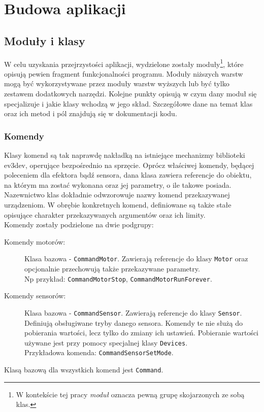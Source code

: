 \chapter{Budowa aplikacji}
\label{ch:budowa_aplikacji}

\section{Moduły i klasy}
\indent \indent W celu uzyskania przejrzystości aplikacji, wydzielone zostały moduły\footnote{W kontekście tej pracy \textit{moduł} oznacza pewną grupę skojarzonych ze sobą klas.}, które opisują pewien fragment funkcjonalności programu. Moduły niższych warstw mogą być wykorzystywane przez moduły warstw wyższych lub być tylko zestawem dodatkowych narzędzi. Kolejne punkty opisują w czym dany moduł się specjalizuje i jakie klasy wchodzą w jego skład. Szczegółowe dane na temat klas oraz ich metod i pól znajdują się w dokumentacji kodu.

\subsection{Komendy}
\indent \indent Klasy komend są tak naprawdę nakładką na istniejące mechanizmy biblioteki ev3dev, operujące bezpośrednio na sprzęcie. Oprócz właściwej komendy, będącej poleceniem dla efektora bądź sensora, dana klasa zawiera referencje do obiektu, na którym ma zostać wykonana oraz jej parametry, o ile takowe posiada. Nazewnictwo klas dokładnie odwzorowuje nazwy komend przekazywanej urządzeniom. W obrębie konkretnych komend, definiowane są także stałe opisujące charakter przekazywanych argumentów oraz ich limity.\\
Komendy zostały podzielone na dwie podgrupy:
\begin{description}
    \item[Komendy motorów:] Klasa bazowa - {\tt CommandMotor}. Zawierają referencje do klasy {\tt Motor} oraz opcjonalnie przechowują także przekazywane parametry. \\Np przykład: {\tt CommandMotorStop}, {\tt CommandMotorRunForever}.

    \item[Komendy sensorów:] Klasa bazowa - {\tt CommandSensor}. Zawierają referencje do klasy {\tt Sensor}. Definiują obsługiwane tryby danego sensora. Komendy te nie służą do pobierania wartości, lecz tylko do zmiany ich ustawień. Pobieranie wartości używane jest przy pomocy specjalnej klasy {\tt Devices}. \\Przykładowa komenda: {\tt CommandSensorSetMode}.
\end{description}
Klasą bazową dla wszystkich komend jest {\tt Command}.

